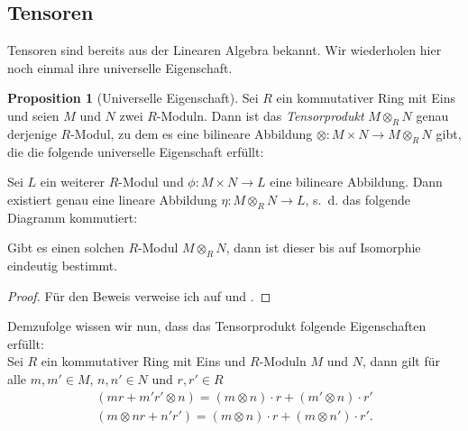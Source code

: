 \documentclass[11pt,titlepage]{article}
\theoremstyle{definition}
\newtheorem{proposition}[theorem]{Proposition}
\theoremstyle{remark}
\begin{document}
	\subsection{Tensoren}
	
	Tensoren sind bereits aus der Linearen Algebra bekannt. Wir wiederholen hier 
	noch einmal ihre universelle Eigenschaft.
	
	\begin{proposition}[Universelle Eigenschaft] \label{prop:univeig}
		Sei $R$ ein kommutativer Ring mit Eins und seien $M$ und $N$ zwei $R$-Moduln. Dann ist das 
		\textsl{Tensorprodukt} $M\otimes_R N$ genau derjenige $R$-Modul, zu dem es eine bilineare Abbildung 
		$\otimes: M\times N \to M\otimes_R N$ gibt, die die folgende universelle Eigenschaft erfüllt:
		\begin{center}
			Sei $L$ ein weiterer $R$-Modul und $\phi: M\times N \to L$ eine bilineare Abbildung. Dann 
			existiert genau eine lineare Abbildung $\eta: M\otimes_R N \to L$, s.~d. das folgende Diagramm 
			kommutiert:
			\begin{center}
			\end{center}
		\end{center}
		Gibt es einen solchen $R$-Modul $M\otimes_R N$, dann ist dieser bis auf Isomorphie eindeutig bestimmt.
	\end{proposition}
	
	\begin{proof}
		Für den Beweis verweise ich auf \cite[Proposition 2.12]{introductiontocomalg} und \cite[Satz 7.3]{SkriptLA}.
	\end{proof}
	
	Demzufolge wissen wir nun, dass das Tensorprodukt folgende Eigenschaften erfüllt: \\ 
	Sei $R$ ein kommutativer Ring 
	mit Eins und $R$-Moduln $M$ und $N$, dann gilt für alle $m,m'\in M$, $n,n'\in N$ und $r,r'\in R$
	\begin{align*}
		(mr+m'r'\otimes n)=(m\otimes n)\cdot r +(m'\otimes n)\cdot r' \\
		(m\otimes nr+n'r')=(m\otimes n)\cdot r+(m\otimes n')\cdot r'.
	\end{align*}
	
\end{document}
